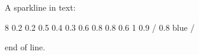\documentclass{article}
\begin{document}
A sparkline in text:
\begin{sparkline}{8}
 0.2  0.2 0.5  0.4 0.3  0.6 0.8  0.8 0.6  1 0.9 /
 0.8 blue /
\end{sparkline}
end of line.
\end{document}
